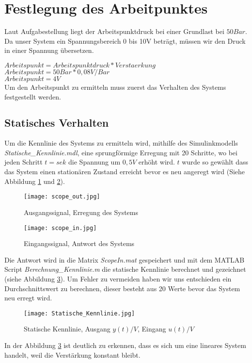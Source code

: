 

\newpage
[Hansert]
\section{Festlegung des Arbeitpunktes}

Laut Aufgabestellung liegt der Arbeitspunktdruck bei einer Grundlast bei $50Bar$. Da unser System ein Spannungsbereich 0 bis 10V beträgt, müssen wir den Druck in einer Spannung übersetzen.

$Arbeitspunkt = Arbeitspunktdruck * Verstaerkung$\\
$Arbeitspunkt = 50Bar * 0,08V/Bar$\\
$Arbeitspunkt = 4V$\\ 


Um den Arbeitspunkt zu ermitteln muss zuerst das Verhalten des Systems festgestellt werden.


\subsection{Statisches Verhalten}
Um die Kennlinie des Systems zu ermitteln wird, mithilfe des Simulinkmodells \textit{Statische\_Kennlinie.mdl}, eine sprungförmige Erregung mit 20 Schritte, wo bei jeden Schritt $t= sek$ die Spannung um $0,5V$ erhöht wird. $t$ wurde so gewählt dass das System einen stationären Zustand erreicht bevor es neu angeregt wird (Siehe Abbildung \ref{ScopOut} und \ref{ScopIn}).

\begin{figure}[h]
	\begin{center}
		\texttt{[image: scope\_out.jpg]}
		\caption{Ausgangssignal, Erregung des Systems}
       \label{ScopOut}
	\end{center} 
\end{figure}


\begin{figure}[h]
	\begin{center}
		\texttt{[image: scope\_in.jpg]}
		\caption{Eingangssignal, Antwort des Systems}
       \label{ScopIn}
	\end{center} 
\end{figure}

Die Antwort wird in die Matrix \textit{ScopeIn.mat} gespeichert und mit dem MATLAB Script \textit{Berechnung\_Kennlinie.m} die statische Kennlinie berechnet und gezeichnet (siehe Abbildung \ref{StatKenn}). Um Fehler zu vermeiden haben wir uns entschieden ein Durchschnittswert zu berechnen, dieser besteht aus 20 Werte bevor das System neu erregt wird.


\begin{figure}[h]
	\begin{center}
		\texttt{[image: Statische\_Kennlinie.jpg]}
		\caption{Statische Kennlinie, Ausgang $y(t)/V$, Eingang $u(t)/V$}
       \label{StatKenn}
	\end{center} 
\end{figure}

In der Abbildung \ref{StatKenn} ist deutlich zu erkennen, dass es sich um eine lineares System handelt, weil die Verstärkung konstant bleibt.